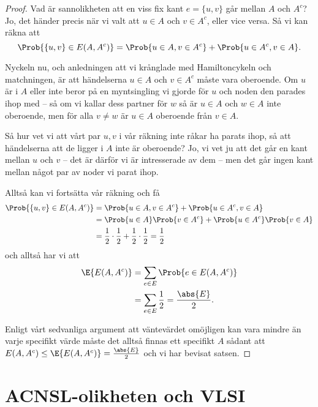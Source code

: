 \documentclass[nobib]{tufte-handout}
\begin{document}
\begin{proposition}
\begin{proof}
    Vad är sannolikheten att en viss fix kant $e = \{u, v\}$ går mellan $A$ och $A^c$? Jo, det händer precis när vi valt att $u \in A$ och $v \in A^c$, eller vice versa. Så vi kan räkna att
    $$\Prob{\{u,v\} \in E(A, A^c)} = \Prob{u \in A, v \in A^c} + \Prob{u \in A^c, v \in A}.$$
    
    Nyckeln nu, och anledningen att vi krånglade med Hamiltoncykeln och matchningen, är att händelserna $u\in A$ och $v\in A^c$ måste vara oberoende. Om $u$ är i $A$ eller inte beror på en myntsingling vi gjorde för $u$ och noden den parades ihop med -- så om vi kallar dess partner för $w$ så är $u \in A$ och $w \in A$ inte oberoende, men för alla $v \neq w$ är $u \in A$ oberoende från $v \in A$.

    Så hur vet vi att vårt par $u, v$ i vår räkning inte råkar ha parats ihop, så att händelserna att de ligger i $A$ inte är oberoende? Jo, vi vet ju att det går en kant mellan $u$ och $v$ -- det är därför vi är intresserade av dem -- men det går ingen kant mellan något par av noder vi parat ihop.

    Alltså kan vi fortsätta vår räkning och få
    \begin{align*}
      \Prob{\{u,v\} \in E(A, A^c)} &= \Prob{u \in A, v \in A^c} + \Prob{u \in A^c, v \in A}\\
      &= \Prob{u \in A}\Prob{v \in A^c} + \Prob{u \in A^c}\Prob{v \in A}\\
      &= \frac{1}{2}\cdot\frac{1}{2} + \frac{1}{2}\cdot\frac{1}{2} = \frac{1}{2}
    \end{align*}
    och alltså har vi att
    \begin{align*}
      \E{E(A,A^c)} &= \sum_{e \in E} \Prob{e \in E(A, A^c)}\\
      &= \sum_{e \in E} \frac{1}{2} = \frac{\abs{E}}{2}.
    \end{align*}

    Enligt vårt sedvanliga argument att väntevärdet omöjligen kan vara mindre än varje specifikt värde måste det alltså finnas ett specifikt $A$ sådant att $E(A, A^c) \leq \E{E(A,A^c)} = \frac{\abs{E}}{2}$ och vi har bevisat satsen.
  \end{proof}
\end{proposition}

\section{ACNSL-olikheten och VLSI}
\end{document}
